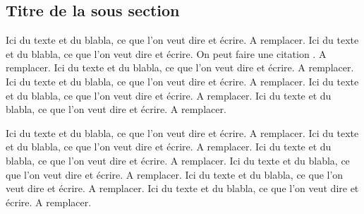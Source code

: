 \subsection{Titre de la sous section}

Ici du texte et du blabla, ce que l'on veut dire et écrire. A remplacer. Ici du texte et du blabla, ce que l'on veut dire et écrire. On peut faire une citation \cite{MotClef4}.
A remplacer. Ici du texte et du blabla, ce que l'on veut dire et écrire. A remplacer. Ici du texte et du blabla, ce que l'on veut dire et écrire. A remplacer. Ici du texte et du blabla, ce que l'on veut dire et écrire. A remplacer. Ici du texte et du blabla, ce que l'on veut dire et écrire. A remplacer.

Ici du texte et du blabla, ce que l'on veut dire et écrire. A remplacer. Ici du texte et du blabla, ce que l'on veut dire et écrire. A remplacer.
Ici du texte et du blabla, ce que l'on veut dire et écrire. A remplacer. Ici du texte et du blabla, ce que l'on veut dire et écrire. A remplacer. Ici du texte et du blabla, ce que l'on veut dire et écrire. A remplacer. Ici du texte et du blabla, ce que l'on veut dire et écrire. A remplacer.

\clearpage
